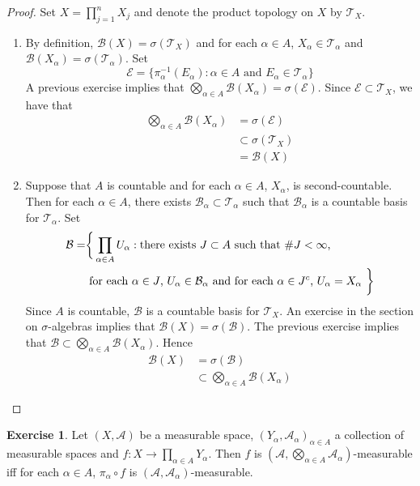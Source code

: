 \documentclass[12pt]{amsart}
\theoremstyle{definition}
\newtheorem{ex}[definition]{Exercise}
\newcommand{\al}{\alpha}
\newcommand{\sig}{\sigma}
\newcommand{\MA}{\mathcal{A}}
\newcommand{\MB}{\mathcal{B}}
\newcommand{\ME}{\mathcal{E}}
\newcommand{\MT}{\mathcal{T}}
\begin{document}
 	\begin{proof} Set $X = \prod_{j=1}^n X_j$ and denote the product topology on $X$ by $\MT_X$. 
 		\begin{enumerate}
 			\item By definition, $\MB(X) = \sig(\MT_X)$ and for each $\al \in A$, $X_{\al} \in \MT_{\al}$ and $\MB(X_{\al}) = \sig(\MT_{\al})$. Set 
 			$$\ME = \{\pi^{-1}_{\al}(E_{\al}): \al \in A \text{ and } E_{\al} \in \MT_{\al} \}$$ 
 			A previous exercise implies that $\bigotimes\limits_{\al \in A} \MB(X_{\al}) = \sig(\ME)$. Since $\ME \subset \MT_X$, we have that
 			\begin{align*}
 				\bigotimes_{\al \in A} \MB(X_{\al}) 
 				& = \sig(\ME) \\
 				& \subset \sig(\MT_X) \\
 				& = \MB(X)
 			\end{align*}
 			\item Suppose that $A$ is countable and for each $\al \in A$, $X_{\al}$, is second-countable. Then for each $\al \in A$, there exists $\MB_{\al} \subset \MT_{\al}$ such that $\MB_{\al}$ is a countable basis for $\MT_{\al}$. Set 
 			\begin{align*}
 				\MB = 
 				& \bigg \{\prod_{\al \in A} U_{\al}: \text{there exists $J \subset A$ such that $ \# J < \infty$, } \\
 				& \text{ for each $\al \in J$, $U_{\al} \in \MB_{\al}$ and for each $\al \in J^c$, $U_{\al} = X_{\al}$ } \bigg \}
 			\end{align*} 
 			Since $A$ is countable, $\MB$ is a countable basis for $\MT_X$. An exercise in the section on $\sig$-algebras implies that $\MB(X) = \sig(\MB)$. The previous exercise implies that $\MB \subset \bigotimes\limits_{\al \in A} \MB(X_{\al})$. Hence
 			\begin{align*}
 				\MB(X) 
 				& = \sig(\MB) \\
 				& \subset \bigotimes_{\al \in A} \MB(X_{\al}) 
 			\end{align*}
 		\end{enumerate}
 	\end{proof}
	
	\begin{ex}
		Let $(X, \MA)$ be a measurable space, $(Y_{\al}, \MA_{\al})_{\al \in A}$ a collection of measurable spaces and $f: X \rightarrow \prod_{\al \in A}Y_{\al}$. Then $f$ is $(\MA, \bigotimes\limits_{\al \in A} \MA_{\al})$-measurable iff for each $\al \in A$, $\pi_{\al} \circ f$ is $(\MA, \MA_{\al})$-measurable.
	\end{ex}
	
\end{document}
